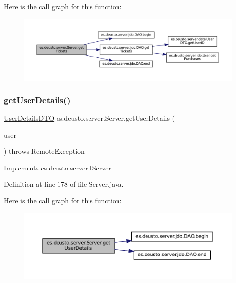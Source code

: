 Here is the call graph for this function\+:
\nopagebreak
\begin{figure}[H]
\begin{center}
\leavevmode
\includegraphics[width=350pt]{classes_1_1deusto_1_1server_1_1_server_ac46819596621f54e4c083d7ea49e3ff0_cgraph}
\end{center}
\end{figure}
\mbox{\label{classes_1_1deusto_1_1server_1_1_server_ad742fe9a45edccd8b2309be98a74baae}} 
\subsubsection{\texorpdfstring{getUserDetails()}{getUserDetails()}}
{\footnotesize\ttfamily \mbox{\hyperlink{classes_1_1deusto_1_1server_1_1data_1_1_user_details_d_t_o}{User\+Details\+D\+TO}} es.\+deusto.\+server.\+Server.\+get\+User\+Details (\begin{DoxyParamCaption}\item[{\mbox{\hyperlink{classes_1_1deusto_1_1server_1_1data_1_1_user_d_t_o}{User\+D\+TO}}}]{user }\end{DoxyParamCaption}) throws Remote\+Exception}



Implements \mbox{\hyperlink{interfacees_1_1deusto_1_1server_1_1_i_server_a2dcd7f0b0e157eb797e20432c0b0e971}{es.\+deusto.\+server.\+I\+Server}}.



Definition at line 178 of file Server.\+java.

Here is the call graph for this function\+:
\nopagebreak
\begin{figure}[H]
\begin{center}
\leavevmode
\includegraphics[width=350pt]{classes_1_1deusto_1_1server_1_1_server_ad742fe9a45edccd8b2309be98a74baae_cgraph}
\end{center}
\end{figure}
\mbox{\label{classes_1_1deusto_1_1server_1_1_server_ab93f5cc9b5825192c31cd2088014378d}} 
